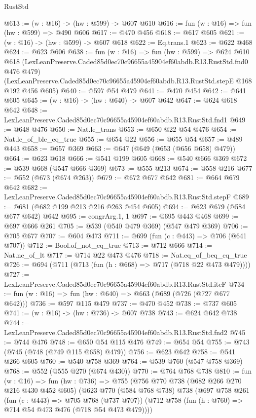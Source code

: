 \begin{lexlean}{RustStd}
\begin{coremodule}
@613 := (w : @16) -> (hw : @599) -> @607 @610
@616 := fun (w : @16) => fun (hw : @599) => @490 @606
@617 := @470 @456
@618 := @617 @605
@621 := (w : @16) -> (hw : @599) -> @607 @618
@622 := Eq.trans.{1}
@623 := @622 @468
@624 := @623 @606
@638 := fun (w : @16) =>
  fun (hw : @599) =>
  @624
    @610
    @618
    (LexLeanPreserve.Caded85d0ec70c96655a45904ef60abdb.R13.RustStd.fnd0 @476 @479)
    (LexLeanPreserve.Caded85d0ec70c96655a45904ef60abdb.R13.RustStd.stepE @168 @192 @456 @605)
@640 := @597 @54 @479
@641 := @470 @454
@642 := @641 @605
@645 := (w : @16) -> (hw : @640) -> @607 @642
@647 := @624 @618 @642
@648 := LexLeanPreserve.Caded85d0ec70c96655a45904ef60abdb.R13.RustStd.fnd1
@649 := @648 @476
@650 := Nat.le_trans
@653 := @650 @22 @54 @476
@654 := Nat.le_of_ble_eq_true
@655 := @654 @22
@656 := @655 @54
@657 := @489 @443
@658 := @657 @369
@663 := @647 (@649 (@653 (@656 @658) @479))
@664 := @623 @618
@666 := @541 @199 @605
@668 := @540 @666 @369
@672 := @539 @668 (@547 @666 @369)
@673 := @555 @213
@674 := @558 @216
@677 := @552 (@673 (@674 @263))
@679 := @672 @677 @642
@681 := @664 @679 @642
@682 := LexLeanPreserve.Caded85d0ec70c96655a45904ef60abdb.R13.RustStd.stepF
@689 := @681 (@682 @199 @213 @216 @263 @454 @605)
@694 := @623 @679 (@584 @677 @642) @642
@695 := congrArg.{1, 1}
@697 := @695 @443 @468
@699 := @697 @666 @261
@705 := @539 (@540 @479 @369) (@547 @479 @369)
@706 := @705 @677
@707 := @604 @473
@711 := @699 (fun (c : @443) => @706 (@641 @707))
@712 := Bool.of_not_eq_true
@713 := @712 @666
@714 := Nat.ne_of_lt
@717 := @714 @22 @473 @476
@718 := Nat.eq_of_beq_eq_true
@726 := @694 (@711 (@713 (fun (h : @668) => @717 (@718 @22 @473 @479))))
@727 := LexLeanPreserve.Caded85d0ec70c96655a45904ef60abdb.R13.RustStd.iteF
@734 := fun (w : @16) => fun (hw : @640) => @663 (@689 (@726 (@727 @677 @642)))
@736 := @597 @115 @479
@737 := @470 @452
@738 := @737 @605
@741 := (w : @16) -> (hw : @736) -> @607 @738
@743 := @624 @642 @738
@744 := LexLeanPreserve.Caded85d0ec70c96655a45904ef60abdb.R13.RustStd.fnd2
@745 := @744 @476
@748 := @650 @54 @115 @476
@749 := @654 @54
@755 := @743 (@745 (@748 (@749 @115 @658) @479))
@756 := @623 @642
@758 := @541 @266 @605
@760 := @540 @758 @369
@764 := @539 @760 (@547 @758 @369)
@768 := @552 (@555 @270 (@674 @430))
@770 := @764 @768 @738
@810 := fun (w : @16) =>
  fun (hw : @736) =>
  @755
    (@756
      @770
      @738
      (@682 @266 @270 @216 @430 @452 @605)
      (@623
        @770
        (@584 @768 @738)
        @738
        (@697
          @758
          @261
          (fun (c : @443) => @705 @768 (@737 @707))
          (@712 @758 (fun (h : @760) => @714 @54 @473 @476 (@718 @54 @473 @479))))

\end{coremodule}
\end{lexlean}
